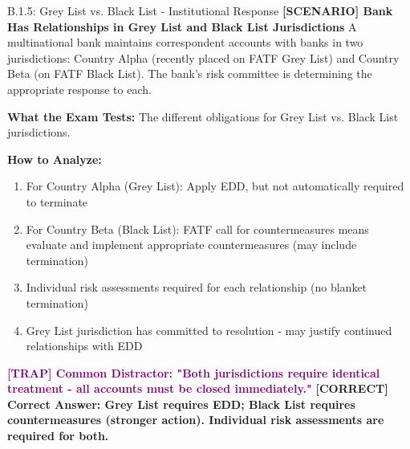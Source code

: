 \documentclass[11pt,a4paper]{beamer}
\newcommand{\trap}[1]{\textcolor{purple}{\textbf{[TRAP] #1}}}
\newcommand{\correct}[1]{\textcolor{green!50!black}{\textbf{[CORRECT] #1}}}
\newcommand{\scenario}[1]{\textcolor{blue!70!black}{\textbf{[SCENARIO] #1}}}
\begin{document}
	\begin{frame}{B.1.5: Grey List vs. Black List - Institutional Response}
		\scenario{Bank Has Relationships in Grey List and Black List Jurisdictions}
		A multinational bank maintains correspondent accounts with banks in two jurisdictions: Country Alpha (recently placed on FATF Grey List) and Country Beta (on FATF Black List). The bank's risk committee is determining the appropriate response to each.
		
		\vspace{0.1cm}
		\textbf{What the Exam Tests:} The different obligations for Grey List vs. Black List jurisdictions.
		
		\vspace{0.1cm}
		\textbf{How to Analyze:}
		\begin{enumerate}
			\item For Country Alpha (Grey List): Apply EDD, but not automatically required to terminate
			\item For Country Beta (Black List): FATF call for countermeasures means evaluate and implement appropriate countermeasures (may include termination)
			\item Individual risk assessments required for each relationship (no blanket termination)
			\item Grey List jurisdiction has committed to resolution - may justify continued relationships with EDD
		\end{enumerate}
		
		\trap{Common Distractor: "Both jurisdictions require identical treatment - all accounts must be closed immediately."}
		\correct{Correct Answer: Grey List requires EDD; Black List requires countermeasures (stronger action). Individual risk assessments are required for both.}
	\end{frame}
	
\end{document}
